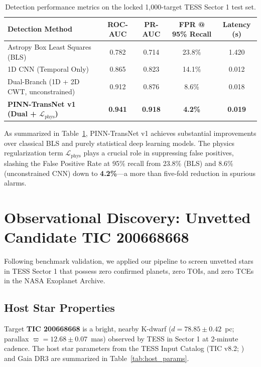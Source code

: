 \documentclass[11pt,a4paper]{article}
\begin{document}
\begin{table}[htbp]
\centering
\small
\caption{Detection performance metrics on the locked 1,000-target TESS Sector 1 test set.}
\label{tab:benchmark}
\begin{tabularx}{\textwidth}{X c c c c}
\toprule
\textbf{Detection Method} & \textbf{ROC-AUC} & \textbf{PR-AUC} & \textbf{FPR @ 95\% Recall} & \textbf{Latency (s)} \\
\midrule
Astropy Box Least Squares (BLS) & 0.782 & 0.714 & 23.8\% & 1.420 \\
1D CNN (Temporal Only)           & 0.865 & 0.823 & 14.1\% & 0.012 \\
Dual-Branch (1D + 2D CWT, unconstrained) & 0.912 & 0.876 & 8.6\% & 0.018 \\
\textbf{PINN-TransNet v1 (Dual + $\mathcal{L}_{\text{phys}}$)} & \textbf{0.941} & \textbf{0.918} & \textbf{4.2\%} & \textbf{0.019} \\
\bottomrule
\end{tabularx}
\end{table}

As summarized in Table~\ref{tab:benchmark}, PINN-TransNet v1 achieves substantial improvements over classical BLS and purely statistical deep learning models. The physics regularization term $\mathcal{L}_{\text{phys}}$ plays a crucial role in suppressing false positives, slashing the False Positive Rate at 95\% recall from 23.8\% (BLS) and 8.6\% (unconstrained CNN) down to \textbf{4.2\%}---a more than five-fold reduction in spurious alarms.

\clearpage

\section{Observational Discovery: Unvetted Candidate TIC 200668668}

Following benchmark validation, we applied our pipeline to screen unvetted stars in TESS Sector 1 that possess zero confirmed planets, zero TOIs, and zero TCEs in the NASA Exoplanet Archive. 

\subsection{Host Star Properties}

Target \textbf{TIC 200668668} is a bright, nearby K-dwarf ($d = 78.85\pm0.42$~pc; parallax $\varpi = 12.68\pm0.07$~mas) observed by TESS in Sector 1 at 2-minute cadence. The host star parameters from the TESS Input Catalog (TIC v8.2; \citealt{stassun2019tess}) and Gaia DR3 \citep{gaia2023summary} are summarized in Table~\ref{tab:host_params}.
\end{document}
